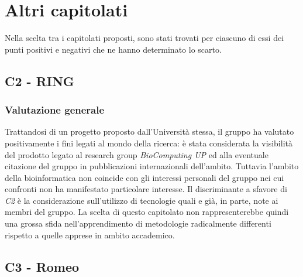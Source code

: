 \clearpage
\section{Altri capitolati}
Nella scelta tra i capitolati proposti, sono stati trovati per ciascuno di essi dei punti positivi e negativi che ne hanno determinato lo scarto.

\subsection{C2 - RING}
        \subsubsection{Valutazione generale}
        Trattandosi di un progetto proposto dall'Università stessa, il gruppo ha valutato positivamente i fini legati al mondo della ricerca: è stata considerata la visibilità del prodotto legato al research group \emph{BioComputing UP} ed alla eventuale citazione del gruppo in pubblicazioni internazionali dell'ambito. Tuttavia l'ambito della bioinformatica non coincide con gli interessi personali del gruppo nei cui confronti non ha manifestato particolare interesse. Il discriminante a sfavore di \emph{C2} è la considerazione sull'utilizzo di tecnologie quali   e   già, in parte, note ai membri del gruppo. La scelta di questo capitolato non rappresenterebbe quindi una grossa sfida nell'apprendimento di metodologie radicalmente differenti rispetto a quelle apprese in ambito accademico.
        
\subsection{C3 - Romeo}
